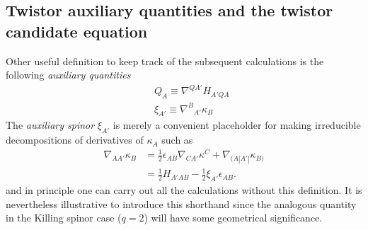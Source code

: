 \documentclass[10pt,a4paper]{article}
\theoremstyle{plain}
\begin{document}
{  \subsection{Twistor auxiliary quantities and the twistor candidate equation}
Other useful definition to keep track of the subsequent
calculations is the following \emph{auxiliary quantities}
\begin{subequations}
  \begin{eqnarray}
      && Q_{A}  \equiv \nabla^{QA'}H_{A'QA} \label{def_Q_twistor} \\
      && \xi_{A'} \equiv \nabla^B{}_{A'}\kappa_B \label{def_xi_twistor}
  \end{eqnarray}
\end{subequations}
  The \emph{auxiliary spinor} $\xi_{A'}$ is merely a convenient
  placeholder for making irreducible decompositions of derivatives of
  $\kappa_A$ such as
  \begin{align}\label{decomp_Der_kappa}
    \nabla_{AA'}\kappa _{B} & = \tfrac{1}{2} \epsilon _{AB}
    \nabla_{CA'}\kappa ^{C} + \nabla_{(A|A'|}\kappa _{B)}
 \\ & = \tfrac{1}{2} H_{A'AB} - \tfrac{1}{2} \xi _{A'} \epsilon_{AB}.
  \end{align}
  and in principle one can carry out all the calculations without this
  definition. It is nevertheless illustrative to introduce this
  shorthand since the analogous quantity in the Killing spinor case
  ($q=2$) will have some geometrical significance.

  \medskip
  
}
\end{document}
